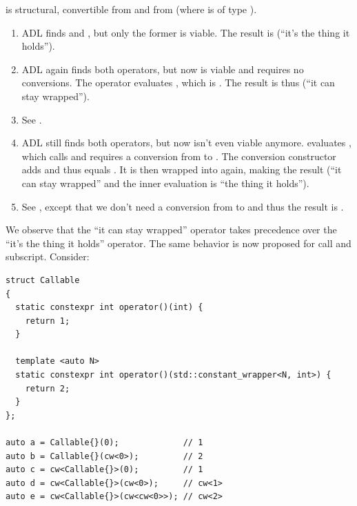  is structural, convertible from  and from  (where  is of type
).
\begin{enumerate}
  \item[\code{a}.] ADL finds  and , but only
    the former is viable.
    The result is  (“it's the thing it holds”).

  \item[\code{b}.] ADL again finds both operators, but now  is
    viable and requires no conversions.
    The  operator evaluates , which is .
    The result is thus  (“it can stay wrapped”).

  \item[\code{c}.] See .

  \item[\code{d}.] ADL still finds both operators, but now  isn't even viable
    anymore.
     evaluates , which calls
     and requires a conversion from  to .
    The conversion constructor adds  and  thus equals .
    It is then wrapped into  again, making the result  (“it
    can stay wrapped” and the inner evaluation is “the thing it holds”).

  \item[\code{e}.] See , except that we don't need a conversion from  to
     and thus the result is .
\end{enumerate}

We observe that the  “it can stay wrapped” operator takes precedence over the
 “it's the thing it holds” operator.
The same behavior is now proposed for call and subscript.
Consider:

\medskip\begin{lstlisting}
struct Callable
{
  static constexpr int operator()(int) {
    return 1;
  }

  template <auto N>
  static constexpr int operator()(std::constant_wrapper<N, int>) {
    return 2;
  }
};

auto a = Callable{}(0);             // 1
auto b = Callable{}(cw<0>);         // 2
auto c = cw<Callable{}>(0);         // 1
auto d = cw<Callable{}>(cw<0>);     // cw<1>
auto e = cw<Callable{}>(cw<cw<0>>); // cw<2>
\end{lstlisting}

